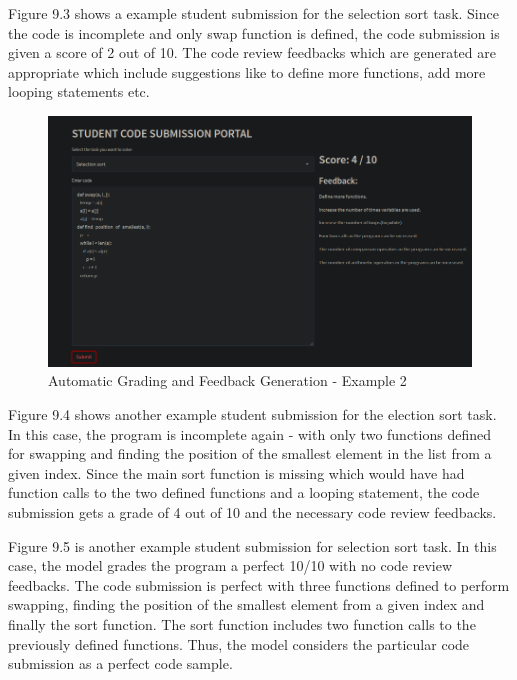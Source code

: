 Figure 9.3 shows a example student submission for the selection sort task. Since the code is incomplete and only swap function is defined, the code submission is given a score of 2 out of 10. The code review feedbacks which are generated are appropriate which include suggestions like to define more functions, add more looping statements etc.

\newpage

\begin{figure}[h!]
\centering
\includegraphics[scale=0.5]{./figures/dep4.png}
\caption{Automatic Grading and Feedback Generation - Example 2}
\label{fig4}
\end{figure}

Figure 9.4 shows another example student submission for the election sort task. In this case, the program is incomplete again - with only two functions defined for swapping and finding the position of the smallest element in the list from a given index. Since the main sort function is missing which would have had function calls to the two defined functions and a looping statement, the code submission gets a grade of 4 out of 10 and the necessary code review feedbacks.

Figure 9.5 is another example student submission for selection sort task. In this case, the model grades the program a perfect 10/10 with no code review feedbacks. The code submission is perfect with three functions defined to perform swapping, finding the position of the smallest element from a given index and finally the sort function. The sort function includes two function calls to the previously defined functions. Thus, the model considers the particular code submission as a perfect code sample. 

\newpage

